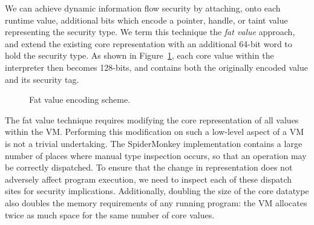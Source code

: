 \documentclass[11pt,onecolumn]{article}
\begin{document}
We can achieve dynamic information flow security by attaching, onto each runtime value, additional bits which encode a pointer, handle, or taint value representing the security type.
We term this technique the \emph{fat value} approach, and extend the existing core representation with an additional 64-bit word to hold the security type.
As shown in Figure~\ref{fig:fat-encoding}, each core value within the interpreter then becomes 128-bits, and contains both the originally encoded value and its security tag.

\begin{figure}[h]
\centering
{}
 \caption{Fat value encoding scheme.}
 \label{fig:fat-encoding}
\end{figure}

The fat value technique requires modifying the core representation of all values within the VM.
Performing this modification on such a low-level aspect of a VM is not a trivial undertaking.
The SpiderMonkey implementation contains a large number of places where manual type inspection occurs, so that an operation may be correctly dispatched.
To ensure that the change in representation does not adversely affect program execution, we need to inspect each of these dispatch sites for security implications.
Additionally, doubling the size of the core datatype also doubles the memory requirements of any running program: the VM allocates twice as much space for the same number of core values.

\end{document}
